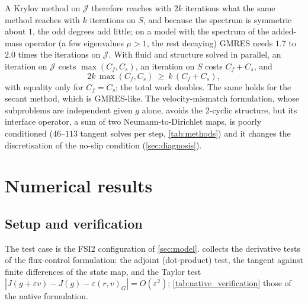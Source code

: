 \documentclass[11pt,a4paper]{article}
\theoremstyle{definition}
\theoremstyle{remark}
\begin{document}
A Krylov method on $\mathcal J$ therefore reaches with $2k$ iterations what the same method reaches
with $k$ iterations on $S$, and because the spectrum is symmetric about $1$, the odd degrees add
little; on a model with the spectrum of the added-mass operator (a few eigenvalues $\mu>1$, the rest
decaying) GMRES needs $1.7$ to $2.0$ times the iterations on $\mathcal J$. With fluid and structure
solved in parallel, an iteration on $\mathcal J$ costs $\max(C_f,C_s)$, an iteration on $S$ costs
$C_f+C_s$, and
\begin{equation}\label{eq:parallel_cost}
  2k\,\max(C_f,C_s)\ \ge\ k\,(C_f+C_s),
\end{equation}
with equality only for $C_f=C_s$; the total work doubles. The same holds for the secant method,
which is GMRES-like. The velocity-mismatch formulation, whose subproblems are independent given $g$
alone, avoids the 2-cyclic structure, but its interface operator, a sum of two
Neumann-to-Dirichlet maps, is poorly conditioned ($46$--$113$ tangent solves per step,
\cref{tab:methods}) and it changes the discretisation of the no-slip condition
(\cref{sec:diagnosis}).

\section{Numerical results}\label{sec:results}

\subsection{Setup and verification}\label{sec:res_setup}

The test case is the FSI2 configuration of \cref{sec:model}.  collects the derivative tests of the flux-control formulation: the adjoint (dot-product) test, the tangent against finite differences of the state map, and the Taylor test $|J(g+\varepsilon v)-J(g)-\varepsilon(r,v)_G| = O(\varepsilon^2)$; \cref{tab:native_verification} those of the native formulation.
\end{document}
